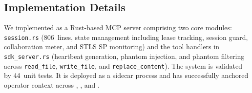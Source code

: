 \subsection{Implementation Details}
We implemented \reaper{} as a Rust-based MCP server comprising two
core modules: \texttt{session.rs} (806~lines, state management
including lease tracking, session guard, collaboration meter, and
STLS SP monitoring) and the tool handlers in \texttt{sdk\_server.rs}
(heartbeat generation, phantom injection, and phantom filtering
across \texttt{read\_file}, \texttt{write\_file}, and
\texttt{replace\_content}). The system is validated by 44~unit tests.
It is deployed as a sidecar process and has successfully anchored
operator context across \cortex{}, \statsig{}, and \clearcut{}.
